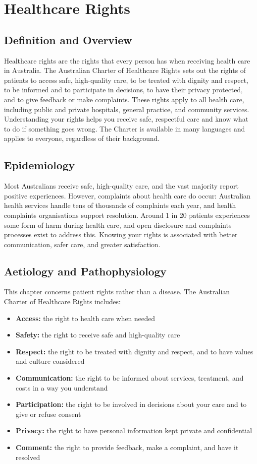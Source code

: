 \chapter{Healthcare Rights}

\section*{Definition and Overview}
Healthcare rights are the rights that every person has when receiving health care in Australia. The Australian Charter of Healthcare Rights sets out the rights of patients to access safe, high-quality care, to be treated with dignity and respect, to be informed and to participate in decisions, to have their privacy protected, and to give feedback or make complaints. These rights apply to all health care, including public and private hospitals, general practice, and community services. Understanding your rights helps you receive safe, respectful care and know what to do if something goes wrong. The Charter is available in many languages and applies to everyone, regardless of their background.

\section*{Epidemiology}
Most Australians receive safe, high-quality care, and the vast majority report positive experiences. However, complaints about health care do occur: Australian health services handle tens of thousands of complaints each year, and health complaints organisations support resolution. Around 1 in 20 patients experiences some form of harm during health care, and open disclosure and complaints processes exist to address this. Knowing your rights is associated with better communication, safer care, and greater satisfaction.

\section*{Aetiology and Pathophysiology}
This chapter concerns patient rights rather than a disease. The Australian Charter of Healthcare Rights includes:

\begin{itemize}
    \item \textbf{Access:} the right to health care when needed
    \item \textbf{Safety:} the right to receive safe and high-quality care
    \item \textbf{Respect:} the right to be treated with dignity and respect, and to have values and culture considered
    \item \textbf{Communication:} the right to be informed about services, treatment, and costs in a way you understand
    \item \textbf{Participation:} the right to be involved in decisions about your care and to give or refuse consent
    \item \textbf{Privacy:} the right to have personal information kept private and confidential
    \item \textbf{Comment:} the right to provide feedback, make a complaint, and have it resolved
\end{itemize}

